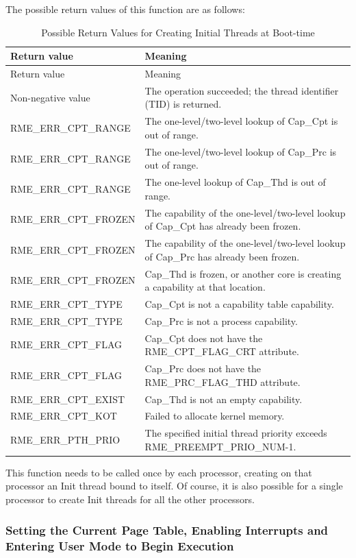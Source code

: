 The possible return values of this function are as follows:

\begin{xltabular}{\textwidth}{@{}>{\hsize\raggedright\arraybackslash}X>{\hsize\raggedright\arraybackslash}X@{}}
\caption{Possible Return Values for Creating Initial Threads at Boot-time}\label{tab:7-60-create-initial-thread-at-boot-return-values}\\
\toprule
Return value & Meaning\tabularnewline
\endfirsthead
\toprule
Return value & Meaning\tabularnewline
\midrule
\endhead
\bottomrule
\endlastfoot
    Non-negative value & The operation succeeded; the thread identifier (TID) is returned.\tabularnewline
    RME\_ERR\_CPT\_RANGE & The one-level/two-level lookup of Cap\_Cpt is out of range.\tabularnewline
    RME\_ERR\_CPT\_RANGE & The one-level/two-level lookup of Cap\_Prc is out of range.\tabularnewline
    RME\_ERR\_CPT\_RANGE & The one-level lookup of Cap\_Thd is out of range.\tabularnewline
    RME\_ERR\_CPT\_FROZEN & The capability of the one-level/two-level lookup of Cap\_Cpt has already been frozen.\tabularnewline
    RME\_ERR\_CPT\_FROZEN & The capability of the one-level/two-level lookup of Cap\_Prc has already been frozen.\tabularnewline
    RME\_ERR\_CPT\_FROZEN & Cap\_Thd is frozen, or another core is creating a capability at that location.\tabularnewline
    RME\_ERR\_CPT\_TYPE & Cap\_Cpt is not a capability table capability.\tabularnewline
    RME\_ERR\_CPT\_TYPE & Cap\_Prc is not a process capability.\tabularnewline
    RME\_ERR\_CPT\_FLAG & Cap\_Cpt does not have the RME\_CPT\_FLAG\_CRT attribute.\tabularnewline
    RME\_ERR\_CPT\_FLAG & Cap\_Prc does not have the RME\_PRC\_FLAG\_THD attribute.\tabularnewline
    RME\_ERR\_CPT\_EXIST & Cap\_Thd is not an empty capability.\tabularnewline
    RME\_ERR\_CPT\_KOT & Failed to allocate kernel memory.\tabularnewline
    RME\_ERR\_PTH\_PRIO & The specified initial thread priority exceeds RME\_PREEMPT\_PRIO\_NUM-1.\tabularnewline
\end{xltabular}
\nopagebreak[4]

This function needs to be called once by each processor, creating on that processor an Init thread bound to itself. Of course, it is also possible for a single processor to create Init threads for all the other processors.

\subsubsection{Setting the Current Page Table, Enabling Interrupts and Entering User Mode to Begin Execution}\label{subsubsec:7-set-page-table-enable-interrupt-and-enter-user-mode}

